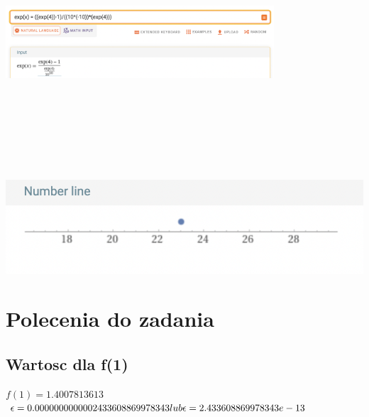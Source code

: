 \documentclass[a4paper,8pt]{article}
\begin{document}
\includegraphics[width=10cm,height=10cm,keepaspectratio]{obliczenia1}
\newline
\includegraphics{obliczenia2}
\section{Polecenia do zadania}


\subsection*{Wartosc dla f(1)}
$f(1) = 1.4007813613$
\newline
$\epsilon = 0.0000000000002433608869978343 \newline lub \newline\epsilon = 2.433608869978343e-13$
\newpage
\end{document}
